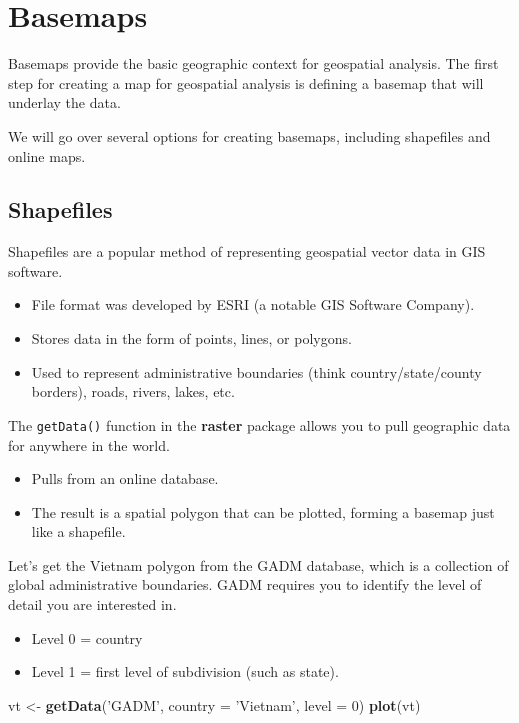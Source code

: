 \documentclass[oneside]{memoir}
\newenvironment{Shaded}{\begin{snugshade}}{\end{snugshade}}
\newcommand{\KeywordTok}[1]{\textcolor[rgb]{0.13,0.29,0.53}{\textbf{#1}}}
\newcommand{\DataTypeTok}[1]{\textcolor[rgb]{0.13,0.29,0.53}{#1}}
\newcommand{\DecValTok}[1]{\textcolor[rgb]{0.00,0.00,0.81}{#1}}
\newcommand{\StringTok}[1]{\textcolor[rgb]{0.31,0.60,0.02}{#1}}
\newcommand{\NormalTok}[1]{#1}
\theoremstyle{definition}
\theoremstyle{definition}
\theoremstyle{definition}
\theoremstyle{remark}
\begin{document}
\chapter{Basemaps}\label{basemaps}

Basemaps provide the basic geographic context for geospatial analysis.
The first step for creating a map for geospatial analysis is defining a
basemap that will underlay the data.

We will go over several options for creating basemaps, including
shapefiles and online maps.

\section{Shapefiles}\label{shapefiles}

Shapefiles are a popular method of representing geospatial vector data
in GIS software.

\begin{itemize}
\item
  File format was developed by ESRI (a notable GIS Software Company).
\item
  Stores data in the form of points, lines, or polygons.
\item
  Used to represent administrative boundaries (think
  country/state/county borders), roads, rivers, lakes, etc.
\end{itemize}

The \texttt{getData()} function in the \textbf{raster} package allows
you to pull geographic data for anywhere in the world.

\begin{itemize}
\item
  Pulls from an online database.
\item
  The result is a spatial polygon that can be plotted, forming a basemap
  just like a shapefile.
\end{itemize}

Let's get the Vietnam polygon from the GADM database, which is a
collection of global administrative boundaries. GADM requires you to
identify the level of detail you are interested in.

\begin{itemize}
\item
  Level 0 = country
\item
  Level 1 = first level of subdivision (such as state).
\end{itemize}

\begin{Shaded}
\begin{Highlighting}[]
\NormalTok{vt <-}\StringTok{ }\KeywordTok{getData}\NormalTok{(}\StringTok{'GADM'}\NormalTok{, }\DataTypeTok{country =} \StringTok{'Vietnam'}\NormalTok{, }\DataTypeTok{level =} \DecValTok{0}\NormalTok{)}
\KeywordTok{plot}\NormalTok{(vt)}
\end{Highlighting}
\end{Shaded}
\end{document}
